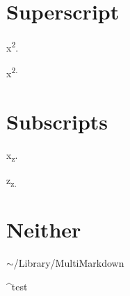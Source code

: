 
\def\mytitle{MultiMarkdown Superscript Test}
\def\latexmode{memoir}


\chapter{Superscript}
\label{superscript}

x\textsuperscript{2}.

x\textsuperscript{2.}

\chapter{Subscripts}
\label{subscripts}

x\textsubscript{z}.

z\textsubscript{z.}

\chapter{Neither}
\label{neither}

\ensuremath{\sim}\slash Library\slash MultiMarkdown

\^{}test




